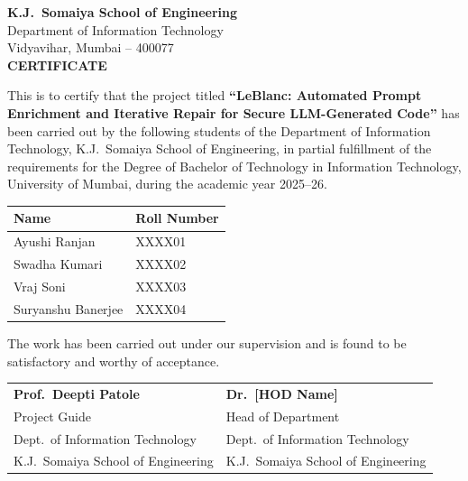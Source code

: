 \documentclass[12pt,a4paper]{report}
\begin{document}
\newpage
\thispagestyle{empty}
\begin{center}
  {\Large\bfseries K.J.\ Somaiya School of Engineering}\\[0.06in]
  {\large Department of Information Technology}\\[0.04in]
  {\normalsize Vidyavihar, Mumbai -- 400077}\\[0.3in]
  {\Large\bfseries CERTIFICATE}
\end{center}

\vspace{0.25in}
\noindent This is to certify that the project titled \textbf{``LeBlanc: Automated Prompt
Enrichment and Iterative Repair for Secure LLM-Generated Code''} has been carried
out by the following students of the Department of Information Technology, K.J.\
Somaiya School of Engineering, in partial fulfillment of the requirements for the
Degree of Bachelor of Technology in Information Technology, University of Mumbai,
during the academic year 2025--26.

\vspace{0.2in}
\begin{center}
\begin{tabular}{ll}
\toprule
\textbf{Name} & \textbf{Roll Number} \\
\midrule
Ayushi Ranjan       & XXXX01 \\
Swadha Kumari       & XXXX02 \\
Vraj Soni           & XXXX03 \\
Suryanshu Banerjee  & XXXX04 \\
\bottomrule
\end{tabular}
\end{center}

\vspace{0.3in}
\noindent The work has been carried out under our supervision and is found to be
satisfactory and worthy of acceptance.

\vspace{0.7in}
\noindent
\begin{tabular}{@{}p{2.8in}p{2.5in}@{}}
  \textbf{Prof.\ Deepti Patole}       & \textbf{Dr.\ [HOD Name]}             \\[0.04in]
  Project Guide                       & Head of Department                   \\[0.04in]
  Dept.\ of Information Technology    & Dept.\ of Information Technology     \\[0.04in]
  K.J.\ Somaiya School of Engineering & K.J.\ Somaiya School of Engineering  \\
\end{tabular}
\end{document}
